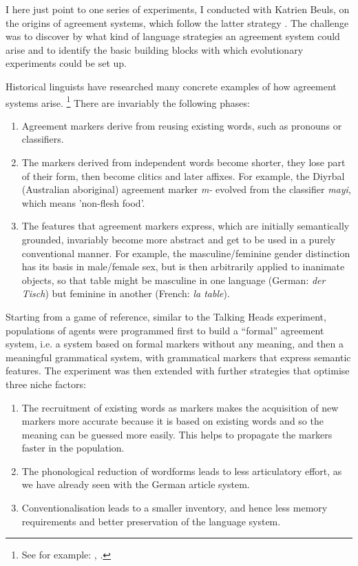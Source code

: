 I here just point to one series of experiments, I conducted with Katrien Beuls, on the origins of agreement 
systems, which follow the latter strategy \cite{Beuls:2013}. The challenge was to discover by 
what kind of language strategies an agreement system could arise and to identify the basic building blocks with which 
evolutionary experiments could be set up. 

Historical linguists have researched many concrete examples of how agreement systems arise.
\footnote{See for example: \cite{Lehmann:1988}, \cite{Luraghi:2011}.}
There are invariably the following phases: 
\begin{enumerate}
\item Agreement markers derive from reusing existing words, such as pronouns or classifiers. 
\item The markers derived from independent words become shorter, they lose part of their form, 
then become clitics and later affixes. For example, the Diyrbal (Australian aboriginal)
agreement marker {\itshape m-} evolved from the classifier {\itshape mayi}, which means 'non-flesh food'. 
\item The features that agreement markers express, which are initially semantically 
grounded, invariably become more abstract and get to be used in 
a purely conventional manner. For example, the masculine/feminine 
gender distinction has its basis in male/female sex, but is then arbitrarily applied to inanimate objects, so that table 
might be masculine in one language (German: {\itshape der Tisch}) but feminine in another (French: {\itshape la table}). 
\end{enumerate}
Starting from a game of reference, similar to the Talking Heads experiment, populations of agents were programmed 
first to build a ``formal'' agreement system, i.e. a system based on formal markers without any meaning, and then 
a meaningful grammatical system, with grammatical markers that express semantic features. The experiment was 
then extended with further strategies that optimise three niche factors:
\begin{enumerate}
\item The recruitment of existing words as markers makes the acquisition of new markers more accurate because it is based 
on existing words and so the meaning can be guessed more easily. This helps to propagate the markers faster in the population. 
\item The phonological reduction of wordforms leads to less articulatory effort, as we have already seen with the German 
article system. 
\item Conventionalisation leads to a smaller inventory, and hence less memory requirements and better preservation of the 
language system. 
\end{enumerate}

